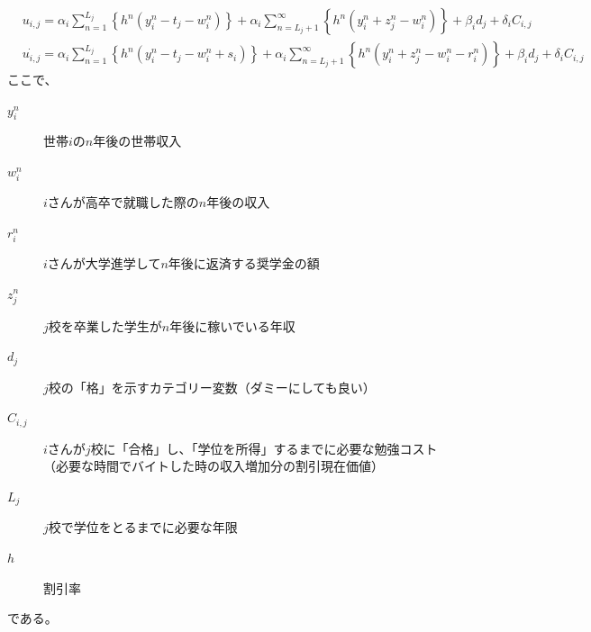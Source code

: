 \documentclass{jsarticle}
\begin{document}
	\begin{align*}
		&u_{i, j} = \alpha_i \sum_{n = 1}^{L_j} \left\{ h^n (y_i^n - t_j - w_i^n) \right\} + \alpha_i \sum_{n = L_j + 1}^{\infty} \left\{ h^n (y_i^n + z_j^n - w_i^n) \right\} + \beta_i d_j + \delta_i C_{i, j} \\
		&\dot{u_{i, j}} = \alpha_i \sum_{n = 1}^{L_j} \left\{ h^n (y_i^n - t_j - w_i^n + s_i) \right\} + \alpha_i \sum_{n = L_j + 1}^{\infty} \left\{ h^n (y_i^n + z_j^n - w_i^n - r_i^n) \right\} + \beta_i d_j + \delta_i C_{i, j} 
	\end{align*}
	ここで、
	\begin{description}
		\item[$y_i^n$] 世帯$i$の$n$年後の世帯収入
		\item[$w_i^n$] $i$さんが高卒で就職した際の$n$年後の収入
		\item[$r_i^n$] $i$さんが大学進学して$n$年後に返済する奨学金の額
		\item[$z_j^n$] $j$校を卒業した学生が$n$年後に稼いでいる年収
		\item[$d_j$] $j$校の「格」を示すカテゴリー変数（ダミーにしても良い）
		\item[$C_{i, j}$] $i$さんが$j$校に「合格」し、「学位を所得」するまでに必要な勉強コスト（必要な時間でバイトした時の収入増加分の割引現在価値）
		\item[$L_j$] $j$校で学位をとるまでに必要な年限
		\item[$h$] 割引率
	\end{description}
	である。
	
\end{document}
